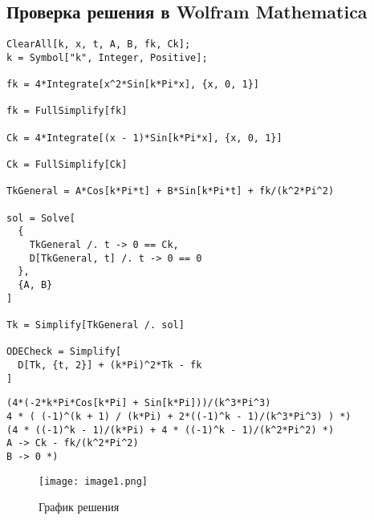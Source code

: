 \documentclass[a4paper,12pt]{article}
\begin{document}


\subsection*{Проверка решения в Wolfram Mathematica}
\begin{lstlisting}[style=wolfram]
ClearAll[k, x, t, A, B, fk, Ck];
k = Symbol["k", Integer, Positive];

fk = 4*Integrate[x^2*Sin[k*Pi*x], {x, 0, 1}]

fk = FullSimplify[fk]

Ck = 4*Integrate[(x - 1)*Sin[k*Pi*x], {x, 0, 1}]

Ck = FullSimplify[Ck]

TkGeneral = A*Cos[k*Pi*t] + B*Sin[k*Pi*t] + fk/(k^2*Pi^2)

sol = Solve[
  {
    TkGeneral /. t -> 0 == Ck,
    D[TkGeneral, t] /. t -> 0 == 0
  },
  {A, B}
]

Tk = Simplify[TkGeneral /. sol]

ODECheck = Simplify[
  D[Tk, {t, 2}] + (k*Pi)^2*Tk - fk
]
\end{lstlisting}

\begin{tcolorbox}[
  colback=wolframbox,
  colframe=gray,
  title=Результаты выполнения,
  boxrule=0.5pt,
  left=2mm,right=2mm,top=1mm,bottom=1mm,
  fontupper=\small\ttfamily
]
\begin{verbatim}
(4*(-2*k*Pi*Cos[k*Pi] + Sin[k*Pi]))/(k^3*Pi^3)
4 * ( (-1)^(k + 1) / (k*Pi) + 2*((-1)^k - 1)/(k^3*Pi^3) ) *)
(4 * ((-1)^k - 1)/(k*Pi) + 4 * ((-1)^k - 1)/(k^2*Pi^2) *)
A -> Ck - fk/(k^2*Pi^2)
B -> 0 *)
\end{verbatim}
\end{tcolorbox}

\begin{figure}[htbp]
    \centering
    \texttt{[image: image1.png]}
    \caption{График решения}
    \label{fig:enter-label}
\end{figure}
\end{document}
